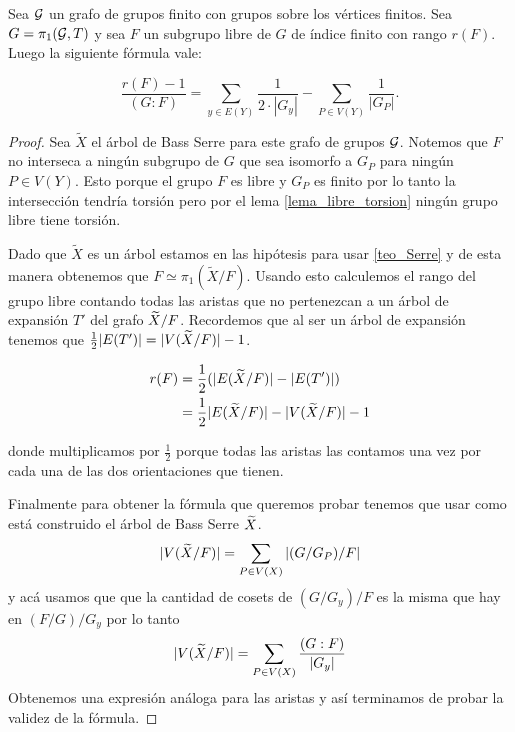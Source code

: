 \documentclass[tesis.tex]{subfiles}
\begin{document}
\begin{prop}\cite{karrass1973finite}\label{prop_karrass_formula}
	Sea $\cal G$ un grafo de grupos finito con grupos sobre los vértices finitos.
	Sea $G = \pi_1 ({\cal G}, T)$ y sea $F$ un subgrupo libre de $G$ de índice finito con rango $r(F)$.
	Luego la siguiente fórmula vale:
	
	\begin{equation*}
		\frac{r(F) - 1}{(G:F)} = \sum_{y \in E(Y)} \frac{1}{2 \cdot |G_y|} - \sum_{P \in V(Y)} \frac{1}{|G_P|}.
	\end{equation*}
\end{prop}
\begin{proof}
	Sea $\tilde X$ el árbol de Bass Serre para este grafo de grupos ${\cal G}$.
	Notemos que $F$ no interseca a ningún subgrupo de $G$ que sea isomorfo a $G_P$ para ningún $P \in V(Y)$. 
	Esto porque el grupo $F$ es libre y $G_P$ es finito por lo tanto la intersección tendría torsión pero por el lema \ref{lema_libre_torsion} ningún grupo libre tiene torsión.
		
	Dado que $\tilde X$ es un árbol estamos en las hipótesis para usar \ref{teo_Serre} y de esta manera obtenemos que $F \simeq \pi_1 (\widetilde X / F)$.
	Usando esto calculemos el rango del grupo libre contando todas las aristas que no pertenezcan a un árbol de expansión $T'$ del grafo $\widetilde X / F$.
	Recordemos que al ser un árbol de expansión tenemos que $\tfrac{1}{2}|E(T')| = |V(\widetilde X / F)| - 1$. 
	
	\begin{align*}
		r(F) &= \frac{1}{2} (|E(\widetilde X / F)| - |E(T')|) \\
		&= \frac{1}{2} |E(\widetilde X / F)| - |V(\widetilde X / F) | - 1
	\end{align*}

	donde multiplicamos por $\tfrac{1}{2}$ porque todas las aristas las contamos una vez por cada una de las dos orientaciones que tienen.
	
	Finalmente para obtener la fórmula que queremos probar tenemos que usar como está construido el árbol de Bass Serre $\widetilde X$.
	\begin{equation*}
		|V(\widetilde X / F)| = \sum_{P \in V(X)} |(G/G_P)/F|
	\end{equation*}
	y acá usamos que que la cantidad de cosets de $(G/G_y)/F$ es la misma que hay en $(F / G)/G_y$
	por lo tanto 
	\begin{equation*}
		|V(\widetilde X / F)| = \sum_{P \in V(X)} \dfrac{(G:F)}{|G_y|}
	\end{equation*}
	Obtenemos una expresión análoga para las aristas y así terminamos de probar la validez de la fórmula.
\end{proof}
\end{document}
